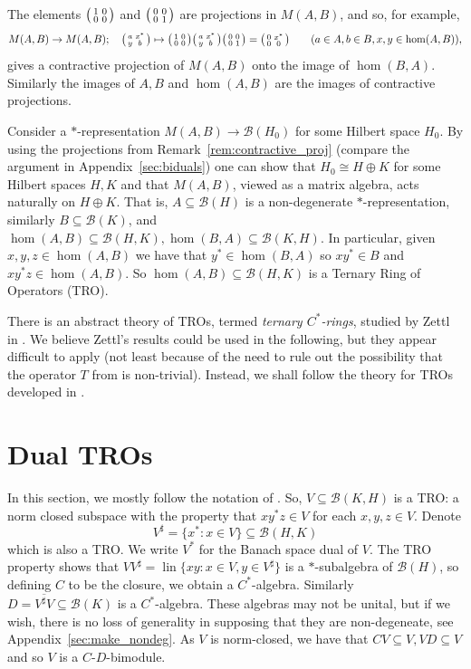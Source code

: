 \documentclass[a4paper,11pt]{article}
\theoremstyle{plain}
\theoremstyle{remark}
\newenvironment{remark}
  {\pushQED{\qed}\renewcommand{\qedsymbol}{$\triangle$}\remarkx}
  {\popQED\endremarkx}
\newcommand{\mc}[1]{\mathcal{#1}}
\newcommand{\lin}{\operatorname{lin}}
\newenvironment{smat}{\bigl(\begin{smallmatrix}}{\end{smallmatrix}\bigr)}
\newcommand{\smattwo}[4]{\begin{smat}{#1}&{#2}\\{#3}&{#4}\end{smat}}
\begin{document}
\begin{remark}\label{rem:contractive_proj}
The elements $\smattwo{1}{0}{0}{0}$ and $\smattwo{0}{0}{0}{1}$ are projections in $M(A,B)$, and so, for example,
\[ M(A,B) \to M(A,B); \quad \smattwo{a}{x^*}{y}{b} \mapsto 
\smattwo{1}{0}{0}{0} \smattwo{a}{x^*}{y}{b} \smattwo{0}{0}{0}{1}
= \smattwo{0}{x^*}{0}{0} \qquad (a\in A,b\in B,x,y\in\hom(A,B)), \]
gives a contractive projection of $M(A,B)$ onto the image of $\hom(B,A)$.  Similarly the images of $A,B$ and $\hom(A,B)$ are the images of contractive projections.
\end{remark}

Consider a $*$-representation $M(A,B) \to \mc B(H_0)$ for some Hilbert space $H_0$.  By using the projections from Remark~\ref{rem:contractive_proj} (compare the argument in Appendix~\ref{sec:biduals}) one can show that $H_0 \cong H\oplus K$ for some Hilbert spaces $H,K$ and that $M(A,B)$, viewed as a matrix algebra, acts naturally on $H\oplus K$.  That is, $A\subseteq\mc B(H)$ is a non-degenerate $*$-representation, similarly $B\subseteq\mc B(K)$, and $\hom(A,B) \subseteq \mc B(H,K), \hom(B,A) \subseteq \mc B(K,H)$.  In particular, given $x,y,z\in\hom(A,B)$ we have that $y^*\in\hom(B,A)$ so $xy^*\in B$ and $xy^*z \in \hom(A,B)$.  So $\hom(A,B) \subseteq \mc B(H,K)$ is a Ternary Ring of Operators (TRO).

There is an abstract theory of TROs, termed \emph{ternary $C^*$-rings}, studied by Zettl in \cite{Zettl_TROs}.  We believe Zettl's results could be used in the following, but they appear difficult to apply (not least because of the need to rule out the possibility that the operator $T$ from \cite[Theorem~3]{Zettl_TROs} is non-trivial).  Instead, we shall follow the theory for TROs developed in \cite[Section~2]{EOR_InjectivityNuclearityOS}.


\section{Dual TROs}\label{sec:dualTROs}

In this section, we mostly follow the notation of \cite{EOR_InjectivityNuclearityOS}.  So, $V\subseteq \mc B(K,H)$ is a TRO: a norm closed subspace with the property that $xy^*z\in V$ for each $x,y,z\in V$.  Denote
\[ V^\sharp = \{ x^* : x\in V \} \subseteq \mc B(H,K) \]
which is also a TRO.  We write $V^*$ for the Banach space dual of $V$.  The TRO property shows that $V V^\sharp = \lin\{ xy : x\in V, y\in V^\sharp \}$ is a $*$-subalgebra of $\mc B(H)$, so defining $C$ to be the closure, we obtain a $C^*$-algebra.  Similarly $D = \overline{V^\sharp V} \subseteq \mc B(K)$ is a $C^*$-algebra.  These algebras may not be unital, but if we wish, there is no loss of generality in supposing that they are non-degeneate, see Appendix~\ref{sec:make_nondeg}.  As $V$ is norm-closed, we have that $CV \subseteq V, VD\subseteq V$ and so $V$ is a $C$-$D$-bimodule.
\end{document}
